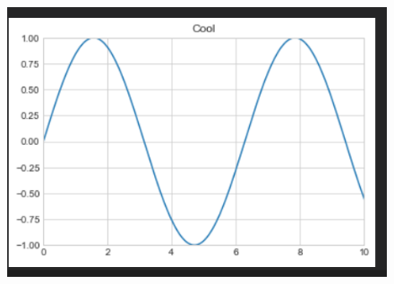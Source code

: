 \begin{figure}[H]
	\centering
	\includegraphics[scale = 0.8]{attachment/chapter_4/Scc022}
\end{figure}

